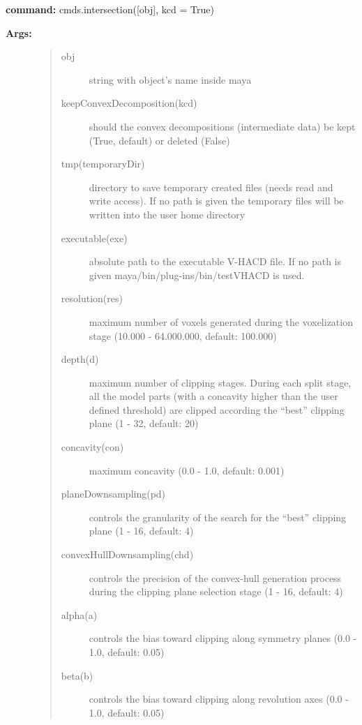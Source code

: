 \documentclass[letterpaper,10pt,english]{sphinxmanual}
\begin{document}
\textbf{command:} cmds.intersection({[}obj{]}, kcd = True)
\begin{description}
\item[{\textbf{Args:}}] \leavevmode\begin{quote}\begin{description}
\item[{obj}] \leavevmode
string with object's name inside maya

\item[{keepConvexDecomposition(kcd)}] \leavevmode
should the convex decompositions (intermediate data) be kept (True, default) or deleted (False)

\item[{tmp(temporaryDir)}] \leavevmode
directory to save temporary created files (needs read and write access). If no path is given the temporary files will be written into the user home directory

\item[{executable(exe)}] \leavevmode
absolute path to the executable V-HACD file. If no path is given maya/bin/plug-ins/bin/testVHACD is used.

\item[{resolution(res)}] \leavevmode
maximum number of voxels generated during the voxelization stage (10.000 - 64.000.000, default: 100.000)

\item[{depth(d)}] \leavevmode
maximum number of clipping stages. During each split stage, all the model parts (with a concavity higher than the user defined threshold) are clipped according the ``best'' clipping plane (1 - 32, default: 20)

\item[{concavity(con)}] \leavevmode
maximum concavity (0.0 - 1.0, default: 0.001)

\item[{planeDownsampling(pd)}] \leavevmode
controls the granularity of the search for the ``best'' clipping plane (1 - 16, default: 4)

\item[{convexHullDownsampling(chd)}] \leavevmode
controls the precision of the convex-hull generation process during the clipping plane selection stage (1 - 16, default: 4)

\item[{alpha(a)}] \leavevmode
controls the bias toward clipping along symmetry planes (0.0 - 1.0, default: 0.05)

\item[{beta(b)}] \leavevmode
controls the bias toward clipping along revolution axes (0.0 - 1.0, default: 0.05)


\end{description}
\end{quote}
\end{description}
\end{document}
